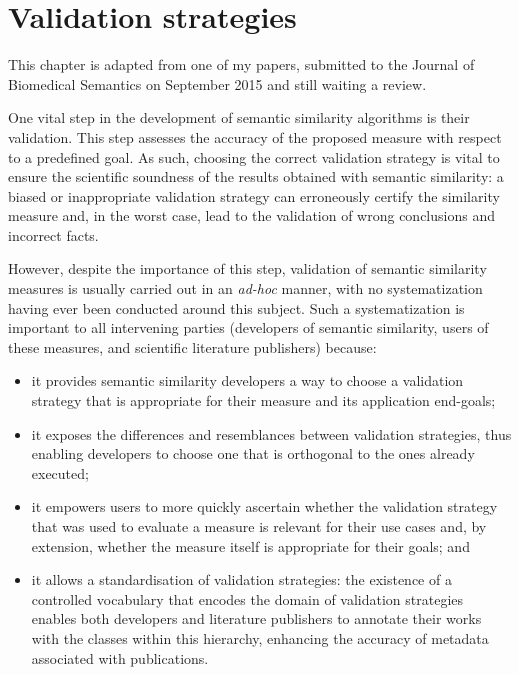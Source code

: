 \chapter{Validation strategies} \label{chap:validation}

\begin{note-paper}
    This chapter is adapted from one of my papers, submitted to the Journal of Biomedical Semantics on September 2015 and still waiting a review.
\end{note-paper}

One vital step in the development of semantic similarity algorithms is their validation. This step assesses the accuracy of the proposed measure with respect to a predefined goal. As such, choosing the correct validation strategy is vital to ensure the scientific soundness of the results obtained with semantic similarity: a biased or inappropriate validation strategy can erroneously certify the similarity measure and, in the worst case, lead to the validation of wrong conclusions and incorrect facts.

However, despite the importance of this step, validation of semantic similarity measures is usually carried out in an \emph{ad-hoc} manner, with no systematization having ever been conducted around this subject. Such a systematization is important to all intervening parties (developers of semantic similarity, users of these measures, and scientific literature publishers) because:
\begin{itemize}
    \item it provides semantic similarity developers a way to choose a validation strategy that is appropriate for their measure and its application end-goals;
    \item it exposes the differences and resemblances between validation strategies, thus enabling developers to choose one that is orthogonal to the ones already executed;
    \item it empowers users to more quickly ascertain whether the validation strategy that was used to evaluate a measure is relevant for their use cases and, by extension, whether the measure itself is appropriate for their goals; and
    \item it allows a standardisation of validation strategies: the existence of a controlled vocabulary that encodes the domain of validation strategies enables both developers and literature publishers to annotate their works with the classes within this hierarchy, enhancing the accuracy of metadata associated with publications.
\end{itemize}


